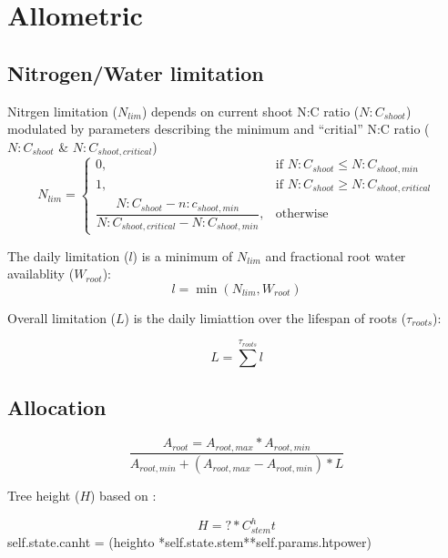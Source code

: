 \chapter{Allometric}
\label{Allometric}

\section{Nitrogen/Water limitation}

Nitrgen limitation ($N_{lim}$) depends on current shoot N:C ratio ($N:C_{shoot}$) modulated by parameters describing the minimum and ``critial'' N:C ratio ($N:C_{shoot}$ \& $N:C_{shoot,critical}$)
\begin{equation}
	N_{lim}=
	\begin{cases}
	    0,& \text{if } N:C_{shoot}\le N:C_{shoot,min} \\
	    1,& \text{if } N:C_{shoot}\ge N:C_{shoot,critical} \\
	    \dfrac{N:C_{shoot} - n:c_{shoot,min}}{N:C_{shoot,critical} - N:C_{shoot,min}},& \text{otherwise}
	\end{cases}
\end{equation}

The daily limitation  ($l$) is a minimum of $N_{lim}$ and fractional root water availablity ($W_{root}$):
\begin{equation}
	l = \min (N_{lim}, W_{root})
\end{equation}

Overall limitation ($L$) is the daily limiattion over the lifespan of roots ($\tau_{roots}$):

\begin{equation}
	L = \sum^{\tau_{roots}} l
\end{equation}

\section{Allocation}

\begin{equation}
	\frac{A_{root}=A_{root,max}*A_{root,min}}{A_{root,min}+(A_{root,max}-A_{root,min})*L}
\end{equation}

Tree height ($H$) based on \citet{Causton1985}:

\begin{equation}
	H = ? * C_{stem} ^ ht
\end{equation}
self.state.canht = (heighto *self.state.stem**self.params.htpower)
                                

